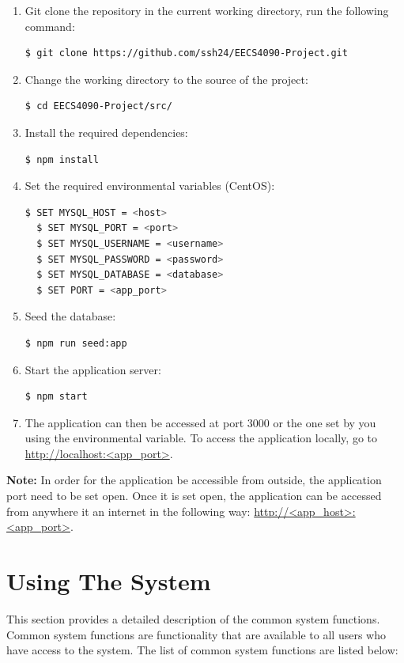 \documentclass[fontsize=12pt,paper=letter,twoside]{scrartcl}
\begin{document}
\smallskip
\begin{enumerate}
\item Git clone the repository in the current working directory, run the following command:
\begin{lstlisting}[language=bash]
  $ git clone https://github.com/ssh24/EECS4090-Project.git
\end{lstlisting}
\item Change the working directory to the source of the project:
\begin{lstlisting}[language=bash]
  $ cd EECS4090-Project/src/
\end{lstlisting}
\item Install the required dependencies:
\begin{lstlisting}[language=bash]
  $ npm install
\end{lstlisting}
\item Set the required environmental variables (CentOS):
\begin{lstlisting}[language=bash]
  $ SET MYSQL_HOST = <host>
  $ SET MYSQL_PORT = <port>
  $ SET MYSQL_USERNAME = <username>
  $ SET MYSQL_PASSWORD = <password>
  $ SET MYSQL_DATABASE = <database>
  $ SET PORT = <app_port>
\end{lstlisting}
\item Seed the database:
\begin{lstlisting}[language=bash]
  $ npm run seed:app
\end{lstlisting}
\item Start the application server:
\begin{lstlisting}[language=bash]
  $ npm start
\end{lstlisting}
\item The application can then be accessed at port 3000 or the one set by you using the environmental variable. To access the application locally, go to \url{http://localhost:<app_port>}.
\end{enumerate}

\bigskip
\noindent \textbf{Note:} In order for the application be accessible from outside, the application port need to be set open. Once it is set open, the application can be accessed from anywhere it an internet in the following way: \url{http://<app_host>:<app_port>}.

\newpage
\section{Using The System}
This section provides a detailed description of the common system functions. Common system functions are functionality that are available to all users who have access to the system. The list of common system functions are listed below:
\end{document}
